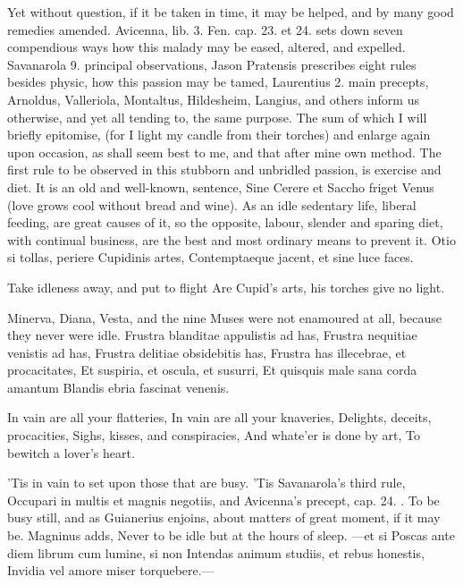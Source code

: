 Yet without question, if it be taken in time, it may be helped, and by
many good remedies amended. Avicenna, lib. 3. Fen. cap. 23. et 24. sets
down seven compendious ways how this malady may be eased, altered, and
expelled. Savanarola 9. principal observations, Jason Pratensis
prescribes eight rules besides physic, how this passion may be tamed,
Laurentius 2. main precepts, Arnoldus, Valleriola, Montaltus,
Hildesheim, Langius, and others inform us otherwise, and yet all
tending to, the same purpose. The sum of which I will briefly
epitomise, (for I light my candle from their torches) and enlarge again
upon occasion, as shall seem best to me, and that after mine own
method. The first rule to be observed in this stubborn and unbridled
passion, is exercise and diet. It is an old and well-known, sentence,
Sine Cerere et Saccho friget Venus (love grows cool without bread and
wine). As an idle sedentary life, liberal feeding, are great
causes of it, so the opposite, labour, slender and sparing diet, with
continual business, are the best and most ordinary means to prevent it.
Otio si tollas, periere Cupidinis artes,
Contemptaeque jacent, et sine luce faces.

Take idleness away, and put to flight
Are Cupid's arts, his torches give no light.

Minerva, Diana, Vesta, and the nine Muses were not enamoured at all,
because they never were idle.
Frustra blanditae appulistis ad has,
Frustra nequitiae venistis ad has,
Frustra delitiae obsidebitis has,
Frustra has illecebrae, et procacitates,
Et suspiria, et oscula, et susurri,
Et quisquis male sana corda amantum
Blandis ebria fascinat venenis.

In vain are all your flatteries,
In vain are all your knaveries,
Delights, deceits, procacities,
Sighs, kisses, and conspiracies,
And whate'er is done by art,
To bewitch a lover's heart.

'Tis in vain to set upon those that are busy. 'Tis Savanarola's third
rule, Occupari in multis et magnis negotiis, and Avicenna's precept,
cap. 24. . To be busy still,
and as Guianerius enjoins, about matters of great moment, if it
may be. Magninus adds, Never to be idle but at the hours of
sleep.
---et si
Poscas ante diem librum cum lumine, si non
Intendas animum studiis, et rebus honestis,
Invidia vel amore miser torquebere.---

